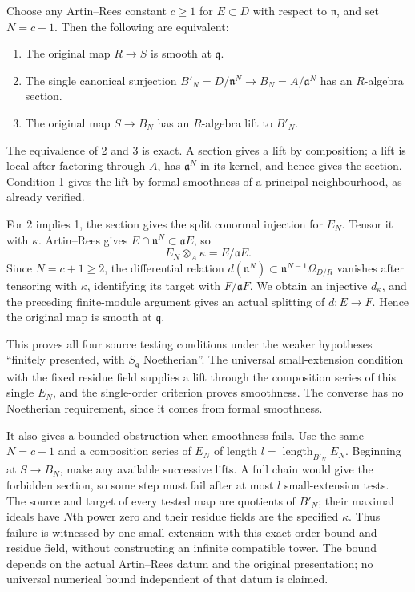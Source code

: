 Choose any Artin--Rees constant \(c\ge1\) for \(E\subset D\) with respect to \(\mathfrak n\), and set \(N=c+1\). Then the following are equivalent:

\begin{enumerate}
\def\labelenumi{\arabic{enumi}.}
\tightlist
\item
  The original map \(R\to S\) is smooth at \(\mathfrak q\).
\item
  The single canonical surjection \(B'_N=D/\mathfrak n^N\to B_N=A/\mathfrak a^N\) has an \(R\)-algebra section.
\item
  The original map \(S\to B_N\) has an \(R\)-algebra lift to \(B'_N\).
\end{enumerate}

The equivalence of 2 and 3 is exact. A section gives a lift by composition; a lift is local after factoring through \(A\), has \(\mathfrak a^N\) in its kernel, and hence gives the section. Condition 1 gives the lift by formal smoothness of a principal neighbourhood, as already verified.

For 2 implies 1, the section gives the split conormal injection for \(E_N\). Tensor it with \(\kappa\). Artin--Rees gives \(E\cap\mathfrak n^N\subset\mathfrak aE\), so \[
E_N\otimes_A\kappa=E/\mathfrak aE.
\] Since \(N=c+1\ge2\), the differential relation \(d(\mathfrak n^N)\subset\mathfrak n^{N-1}\Omega_{D/R}\) vanishes after tensoring with \(\kappa\), identifying its target with \(F/\mathfrak aF\). We obtain an injective \(d_\kappa\), and the preceding finite-module argument gives an actual splitting of \(d:E\to F\). Hence the original map is smooth at \(\mathfrak q\).

This proves all four source testing conditions under the weaker hypotheses ``finitely presented, with \(S_{\mathfrak q}\) Noetherian''. The universal small-extension condition with the fixed residue field supplies a lift through the composition series of this single \(E_N\), and the single-order criterion proves smoothness. The converse has no Noetherian requirement, since it comes from formal smoothness.

It also gives a bounded obstruction when smoothness fails. Use the same \(N=c+1\) and a composition series of \(E_N\) of length \(l=\operatorname{length}_{B'_N}E_N\). Beginning at \(S\to B_N\), make any available successive lifts. A full chain would give the forbidden section, so some step must fail after at most \(l\) small-extension tests. The source and target of every tested map are quotients of \(B'_N\); their maximal ideals have \(N\)th power zero and their residue fields are the specified \(\kappa\). Thus failure is witnessed by one small extension with this exact order bound and residue field, without constructing an infinite compatible tower. The bound depends on the actual Artin--Rees datum and the original presentation; no universal numerical bound independent of that datum is claimed.

